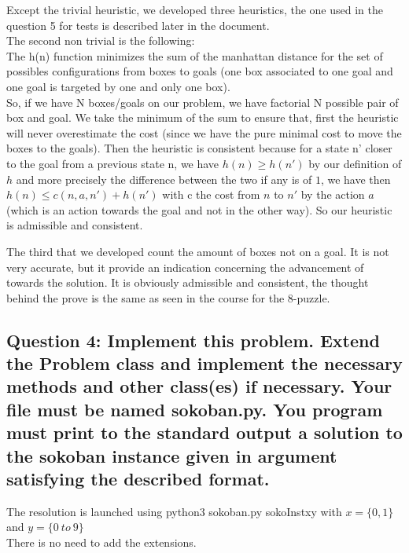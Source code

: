 \documentclass[a4paper,10pt]{article}
\begin{document}
		Except the trivial heuristic, we developed three heuristics, the one used in the question 5 for tests is described later in the document.\\
		
		The second non trivial is the following:\\ 
		The h(n) function minimizes the sum of the manhattan distance for the set of possibles configurations from boxes to goals (one box associated to one goal and one goal is targeted by one and only one box). \\
		So, if we have N boxes/goals on our problem, we have factorial N possible pair of box and goal. We take the minimum of the sum to ensure that, first the heuristic will never overestimate the cost (since we have the pure minimal cost to move the boxes to the goals). Then the heuristic is consistent because for a state n' closer to the goal from a previous state n, we have $ h(n) \geq h(n')$ by our definition of $h$ and more precisely the difference between the two if any is of $1$, we have then $h(n) \leq c(n,a,n')+h(n')$ with c the cost from $n$ to $n'$ by the action $a$ (which is an action towards the goal and not in the other way). So our heuristic is admissible and consistent.
		
The third that we developed count the amount of boxes not on a goal. It is not very accurate, but it provide an indication concerning the advancement of towards the solution. It is obviously admissible and consistent, the thought behind the prove is the same as seen in the course for the 8-puzzle.
		
		\subsection{Question 4: Implement this problem. Extend the Problem class and implement the necessary methods and other class(es) if necessary. Your file must be named sokoban.py. You program must print to the standard output a solution to the sokoban instance given in argument satisfying the described format.}
			The resolution is launched using python3 sokoban.py sokoInstxy with $x = \{0,1\}$ and $y = \{0 \ to \ 9\}$\\
			There is no need to add the extensions.
\end{document}
